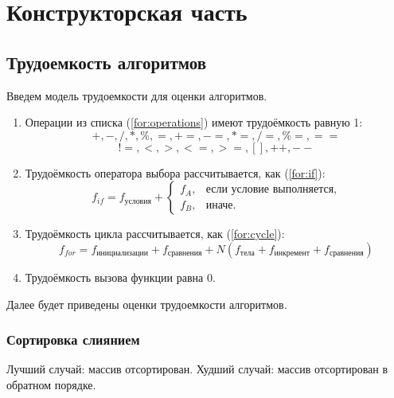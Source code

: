 \chapter{Конструкторская часть}

\section{Трудоемкость алгоритмов}
Введем модель трудоемкости для оценки алгоритмов.
\begin{enumerate}
	\item Операции из списка (\ref{for:operations}) имеют трудоёмкость равную 1:
	\begin{equation}		
		+, -, /, *, \%, =, +=, -=, *=, /=, \%=, ==
		\nonumber
	\end{equation}
\begin{equation}
	\label{for:operations}
	!=, <, >, <=, >=, [], ++, {-}-
		\end{equation}
	\item Трудоёмкость оператора выбора  рассчитывается, как (\ref{for:if}):
	\begin{equation}
		\label{for:if}
		f_{if} = f_{\text{условия}} +
		\begin{cases}
			f_A, & \text{если условие выполняется,}\\
			f_B, & \text{иначе.}
		\end{cases}
	\end{equation}
	\item Трудоёмкость цикла рассчитывается, как (\ref{for:cycle}):
	\begin{equation}
		\label{for:cycle}
		f_{for} = f_{\text{инициализации}} + f_{\text{сравнения}} + N(f_{\text{тела}} + f_{\text{инкремент}} + f_{\text{сравнения}})
	\end{equation}
	\item Трудоёмкость вызова функции равна 0.
\end{enumerate}




Далее будет приведены оценки трудоемкости алгоритмов. 
\subsection{Сортировка слиянием}

Лучший случай: массив отсортирован.
Худший случай: массив отсортирован в обратном порядке.

